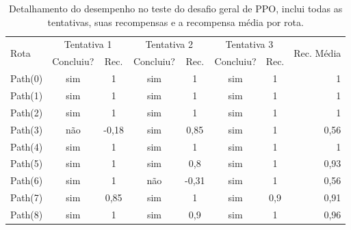 \begin{table}[htpb]
    \centering
    \caption{Detalhamento do desempenho no teste do desafio geral de PPO, inclui todas as tentativas, suas recompensas e a recompensa média por rota.}
    \label{resultado-tabela-geral-ppo}
    \begin{tabular}{|l|c|c|c|c|c|c|r|}
         \hline
         \multirow{2}{*}{Rota} & \multicolumn{2}{c|}{Tentativa 1}  & \multicolumn{2}{c|}{Tentativa 2} & \multicolumn{2}{c|}{Tentativa 3} & \multirow{2}{*}{Rec. Média} \\ \cline{2-7}
                               & \small{Concluiu?}  & \small{Rec.} & \small{Concluiu?} &\small{Rec.} & \small{Concluiu?} &\small{Rec.} &                               \\ \hline
            Path(0)   &      sim        &   1             &    sim          &      1        &    sim          &      1        &      1                 \\ \hline
            Path(1)   &      sim        &   1             &    sim          &      1        &    sim          &      1        &      1                 \\ \hline
            Path(2)   &      sim        &   1             &    sim          &      1        &    sim          &      1        &      1                 \\ \hline
            Path(3)   &      não        &   -0,18         &    sim          &      0,85     &    sim          &      1        &      0,56              \\ \hline
            Path(4)   &      sim        &   1             &    sim          &      1        &    sim          &      1        &      1                 \\ \hline
            Path(5)   &      sim        &   1             &    sim          &      0,8      &    sim          &      1        &      0,93              \\ \hline
            Path(6)   &      sim        &   1             &    não          &      -0,31    &    sim          &      1        &      0,56              \\ \hline
            Path(7)   &      sim        &   0,85          &    sim          &      1        &    sim          &      0,9      &      0,91              \\ \hline
            Path(8)   &      sim        &   1             &    sim          &      0,9      &    sim          &      1        &      0,96              \\ \hline

\end{tabular}
\end{table}
